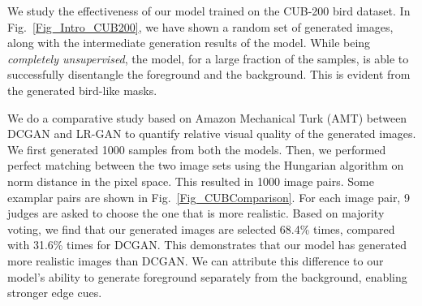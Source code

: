 \documentclass{article} \usepackage{iclr2017_conference,times}
\begin{document}
We study the effectiveness of our model trained on the CUB-200 bird dataset. In Fig.~\ref{Fig_Intro_CUB200}, we have shown a random set of generated images, along with the intermediate generation results of the model. While being \emph{completely unsupervised}, the model, for a large fraction of the samples, is able to successfully disentangle the foreground and the background. This is evident from the generated bird-like masks.


We do a comparative study based on Amazon Mechanical Turk (AMT) between DCGAN and LR-GAN to quantify relative visual quality of the generated images. We first generated 1000 samples from both the models. Then, we performed perfect matching between the two image sets using the Hungarian algorithm on  norm distance in the pixel space. This resulted in 1000 image pairs. Some examplar pairs are shown in Fig.~\ref{Fig_CUBComparison}. For each image pair, 9 judges are asked to choose the one that is more realistic. Based on majority voting, we find that our generated images are selected 68.4\% times, compared with 31.6\% times for DCGAN. This demonstrates that our model has generated more realistic images than DCGAN. We can attribute this difference to our model's ability to generate foreground separately from the background, enabling stronger edge cues. 
\end{document}
